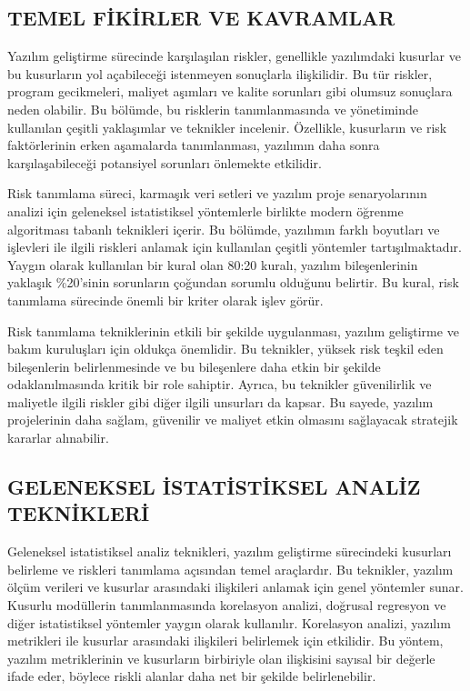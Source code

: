 \documentclass{article}
\begin{document}
\subsection{TEMEL FİKİRLER VE KAVRAMLAR}

Yazılım geliştirme sürecinde karşılaşılan riskler, genellikle yazılımdaki kusurlar ve bu kusurların yol açabileceği istenmeyen sonuçlarla ilişkilidir. Bu tür riskler, program gecikmeleri, maliyet aşımları ve kalite sorunları gibi olumsuz sonuçlara neden olabilir. Bu bölümde, bu risklerin tanımlanmasında ve yönetiminde kullanılan çeşitli yaklaşımlar ve teknikler incelenir. Özellikle, kusurların ve risk faktörlerinin erken aşamalarda tanımlanması, yazılımın daha sonra karşılaşabileceği potansiyel sorunları önlemekte etkilidir.

Risk tanımlama süreci, karmaşık veri setleri ve yazılım proje senaryolarının analizi için geleneksel istatistiksel yöntemlerle birlikte modern öğrenme algoritması tabanlı teknikleri içerir. Bu bölümde, yazılımın farklı boyutları ve işlevleri ile ilgili riskleri anlamak için kullanılan çeşitli yöntemler tartışılmaktadır. Yaygın olarak kullanılan bir kural olan 80:20 kuralı, yazılım bileşenlerinin yaklaşık \%20'sinin sorunların çoğundan sorumlu olduğunu belirtir. Bu kural, risk tanımlama sürecinde önemli bir kriter olarak işlev görür.

Risk tanımlama tekniklerinin etkili bir şekilde uygulanması, yazılım geliştirme ve bakım kuruluşları için oldukça önemlidir. Bu teknikler, yüksek risk teşkil eden bileşenlerin belirlenmesinde ve bu bileşenlere daha etkin bir şekilde odaklanılmasında kritik bir role sahiptir. Ayrıca, bu teknikler güvenilirlik ve maliyetle ilgili riskler gibi diğer ilgili unsurları da kapsar. Bu sayede, yazılım projelerinin daha sağlam, güvenilir ve maliyet etkin olmasını sağlayacak stratejik kararlar alınabilir.


\subsection{GELENEKSEL İSTATİSTİKSEL ANALİZ TEKNİKLERİ}

Geleneksel istatistiksel analiz teknikleri, yazılım geliştirme sürecindeki kusurları belirleme ve riskleri tanımlama açısından temel araçlardır. Bu teknikler, yazılım ölçüm verileri ve kusurlar arasındaki ilişkileri anlamak için genel yöntemler sunar. Kusurlu modüllerin tanımlanmasında korelasyon analizi, doğrusal regresyon ve diğer istatistiksel yöntemler yaygın olarak kullanılır. Korelasyon analizi, yazılım metrikleri ile kusurlar arasındaki ilişkileri belirlemek için etkilidir. Bu yöntem, yazılım metriklerinin ve kusurların birbiriyle olan ilişkisini sayısal bir değerle ifade eder, böylece riskli alanlar daha net bir şekilde belirlenebilir.
\end{document}
